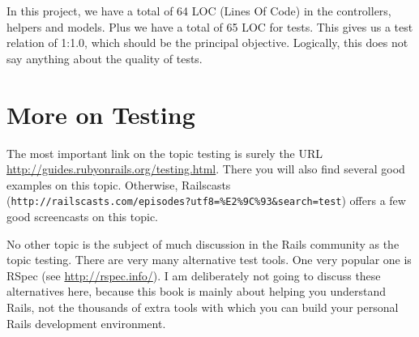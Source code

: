 \documentclass[a4paper]{book}
\begin{document}
In this project, we have a total of 64 LOC (Lines Of Code) in the controllers, helpers and models. Plus we have a total of 65 LOC for tests. This gives us a test relation of 1:1.0, which should be the principal objective. Logically, this does not say anything about the quality of tests.

\section{More on Testing}\label{more-on-testing}

The most important link on the topic testing is surely the URL \url{http://guides.rubyonrails.org/testing.html}. There you will also find several good examples on this topic. Otherwise, Railscasts (\texttt{http://railscasts.com/episodes?utf8=\%E2\%9C\%93\&search=test}) offers a few good screencasts on this topic.

No other topic is the subject of much discussion in the Rails community as the topic testing. There are very many alternative test tools. One very popular one is RSpec (see \url{http://rspec.info/}). I am deliberately not going to discuss these alternatives here, because this book is mainly about helping you understand Rails, not the thousands of extra tools with which you can build your personal Rails development environment.
\end{document}
